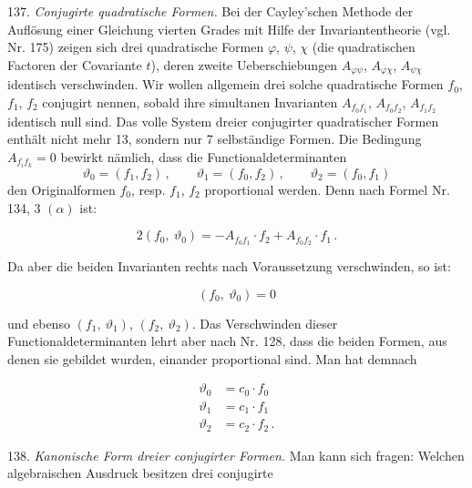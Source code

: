 \documentclass[11pt]{article}
\begin{document}
137. \textit{Conjugirte quadratische Formen.} Bei der Cayley'schen Methode der Aufl\"osung einer Gleichung vierten Grades mit Hilfe der Invariantentheorie (vgl. Nr. 175) zeigen sich drei quadratische Formen $\varphi$, $\psi$, $\chi$ (die quadratischen Factoren der Covariante $t$), deren zweite Ueberschiebungen $A_{\varphi\psi}$, $A_{\varphi\chi}$, $A_{\psi\chi}$ identisch verschwinden. Wir wollen allgemein drei solche quadratische Formen $f_0$, $f_1$, $f_2$ conjugirt nennen, sobald ihre simultanen Invarianten $A_{f_0f_1}$, $A_{f_0f_2}$, $A_{f_1f_2}$ identisch null sind. Das volle System dreier conjugirter quadratischer Formen enth\"alt nicht mehr 13, sondern nur 7 selbst\"andige Formen. Die Bedingung $A_{f_if_k} = 0$ bewirkt n\"amlich, dass die Functionaldeterminanten
\[
\vartheta_0 = (f_1, f_2)\,,\qquad \vartheta_1 = (f_0, f_2)\,,\qquad \vartheta_2 = (f_0, f_1)
\]
den Originalformen $f_0$, resp. $f_1$, $f_2$ proportional werden. Denn nach Formel Nr. 134, 3 $(\alpha)$ ist:

\[
2(f_0,\ \vartheta_0) = -A_{f_0f_1}\cdot f_2 + A_{f_0f_2}\cdot f_1\,.
\]

Da aber die beiden Invarianten rechts nach Voraussetzung verschwinden, so ist:

\[
(f_0,\ \vartheta_0) = 0
\]

und ebenso $(f_1,\ \vartheta_1)$, $(f_2,\ \vartheta_2)$. Das Verschwinden dieser Functionaldeterminanten lehrt aber nach Nr. 128, dass die beiden Formen, aus denen sie gebildet wurden, einander proportional sind. Man hat demnach

\[
\begin{aligned}
\vartheta_0 &= c_0 \cdot f_0 \\
\vartheta_1 &= c_1 \cdot f_1 \\
\vartheta_2 &= c_2 \cdot f_2\,.
\end{aligned}
\]

138. \textit{Kanonische Form dreier conjugirter Formen.} Man kann sich fragen: Welchen algebraischen Ausdruck besitzen drei conjugirte
\end{document}
